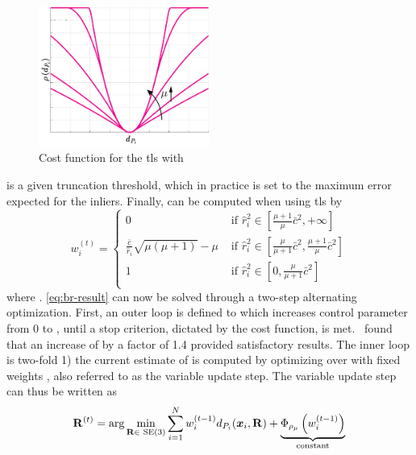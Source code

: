 \begin{figure}[!h]
	\begin{center}
		\includegraphics[width=0.5\textwidth]{chapters/2-pose-estimation/fig/tls-cost.pdf}
	\end{center}
	\caption{Cost function for the \gls{tls} with }
	\label{fig:tls-cost}
\end{figure}
 is a given truncation threshold, which in practice is set to the maximum error expected for the inliers. Finally,  can be computed when using \gls{tls} by
%
\begin{equation}\label{eq:tls-weights}
	w_i^{(t)} = \begin{cases}
		0 & \text{ if } \hat{r}_i^2\in\left[ \frac{\mu+1}{\mu}\bar{c}^2, +\infty \right] \\
		\frac{\bar{c}}{\hat{r}_i}\sqrt{\mu(\mu+1)} - \mu & \text{ if } \hat{r}_i^2\in\left[ \frac{\mu}{\mu+1}\bar{c}^2, \frac{\mu + 1}{\mu}\bar{c}^2 \right] \\
		1 & \text{ if } \hat{r}_i^2\in\left[ 0, \frac{\mu}{\mu + 1}\bar{c}^2 \right] \\
	\end{cases}
\end{equation}
where . \eqref{eq:br-result} can now be solved through a two-step alternating optimization. First, an outer loop is defined to which increases control parameter \mvar{\mu} from \num{0} to \mvar{\infty}, until a stop criterion, dictated by the cost function, is met.~\cite{graduated-non-convexity-for-robust-spatial-perception:-from-non-minimal-solvers-to-global-outlier-rejection} found that an increase of \mvar{\mu} by a factor of \num{1.4} provided satisfactory results.
The inner loop is two-fold 1) the current estimate of  is computed by optimizing over \tf[R]{}{} with fixed weights , also referred to as the variable update step. The variable update step can thus be written as
%
\begin{equation}\label{eq:variable-update}
	\tf[R]{(t)}{} = \arg\min_{\mat{R}\in\SE (3)} \sum^N_{i=1}w_i^{(t-1)}d_{P_i}(\vec{x}_i,\mat{R}) + \underbrace{\Phi_{\rho_\mu}\left(w_i^{(t-1)}\right)}_{\text{constant}}
\end{equation}

